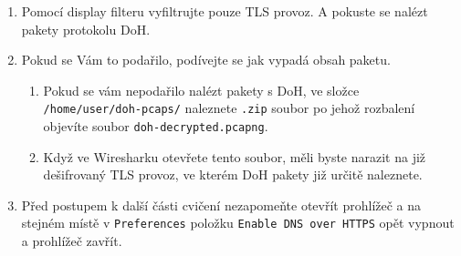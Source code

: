 \begin{enumerate}
    \item Pomocí display filteru vyfiltrujte pouze TLS provoz. A pokuste se nalézt pakety protokolu DoH.
    \item Pokud se Vám to podařilo, podívejte se jak vypadá obsah paketu.
    \begin{enumerate}
        \item Pokud se vám nepodařilo nalézt pakety s DoH, ve složce \texttt{/home/user/doh-pcaps/} naleznete \texttt{.zip} soubor po jehož rozbalení objevíte soubor \texttt{doh-decrypted.pcapng}.
        \item Když ve Wiresharku otevřete tento soubor, měli byste narazit na již dešifrovaný TLS provoz, ve kterém DoH pakety již určitě naleznete.
    \end{enumerate}
    \item Před postupem k další části cvičení nezapomeňte otevřít prohlížeč a na stejném místě v \texttt{Preferences} položku \texttt{Enable DNS over HTTPS} opět vypnout a prohlížeč zavřít.
\end{enumerate}

\newpage
